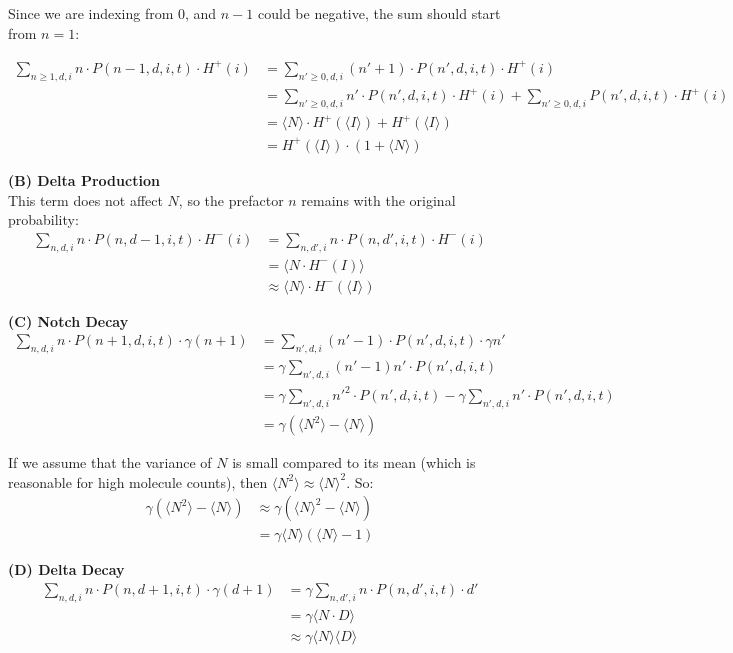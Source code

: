 \documentclass{article}
\begin{document}
\begin{flushleft}
Since we are indexing from 0, and $n-1$ could be negative, the sum should start from $n=1$:

\begin{small}
\begin{align*}
\sum_{n \geq 1,d,i} n \cdot P(n-1,d,i,t) \cdot H^+(i) &= \sum_{n' \geq 0,d,i} (n'+1) \cdot P(n',d,i,t) \cdot H^+(i) \\
&= \sum_{n' \geq 0,d,i} n' \cdot P(n',d,i,t) \cdot H^+(i) + \sum_{n' \geq 0,d,i} P(n',d,i,t) \cdot H^+(i) \\
&= \langle N \rangle \cdot H^+(\langle I \rangle) + H^+(\langle I \rangle) \\
&= H^+(\langle I \rangle) \cdot (1 + \langle N \rangle)
\end{align*}
\end{small}

\textbf{(B) Delta Production}\\
This term does not affect $N$, so the prefactor $n$ remains with the original probability:
\begin{align*}
\sum_{n,d,i} n \cdot P(n,d-1,i,t) \cdot H^-(i) &= \sum_{n,d',i} n \cdot P(n,d',i,t) \cdot H^-(i) \\
&= \langle N \cdot H^-(I) \rangle \\
&\approx \langle N \rangle \cdot H^-(\langle I \rangle)
\end{align*}

\textbf{(C) Notch Decay}
\begin{align*}
\sum_{n,d,i} n \cdot P(n+1,d,i,t) \cdot \gamma(n+1) &= \sum_{n',d,i} (n'-1) \cdot P(n',d,i,t) \cdot \gamma n' \\
&= \gamma \sum_{n',d,i} (n'-1)n' \cdot P(n',d,i,t) \\
&= \gamma \sum_{n',d,i} n'^2 \cdot P(n',d,i,t) - \gamma \sum_{n',d,i} n' \cdot P(n',d,i,t) \\
&= \gamma(\langle N^2 \rangle - \langle N \rangle)
\end{align*}

If we assume that the variance of $N$ is small compared to its mean (which is reasonable for high molecule counts), then $\langle N^2 \rangle \approx \langle N \rangle^2$. So:
\begin{align*}
\gamma(\langle N^2 \rangle - \langle N \rangle) &\approx \gamma(\langle N \rangle^2 - \langle N \rangle) \\
&= \gamma \langle N \rangle (\langle N \rangle - 1)
\end{align*}

\textbf{(D) Delta Decay}
\begin{align*}
\sum_{n,d,i} n \cdot P(n,d+1,i,t) \cdot \gamma(d+1) &= \gamma \sum_{n,d',i} n \cdot P(n,d',i,t) \cdot d' \\
&= \gamma \langle N \cdot D \rangle \\
&\approx \gamma \langle N \rangle \langle D \rangle
\end{align*}


\end{flushleft}
\end{document}
